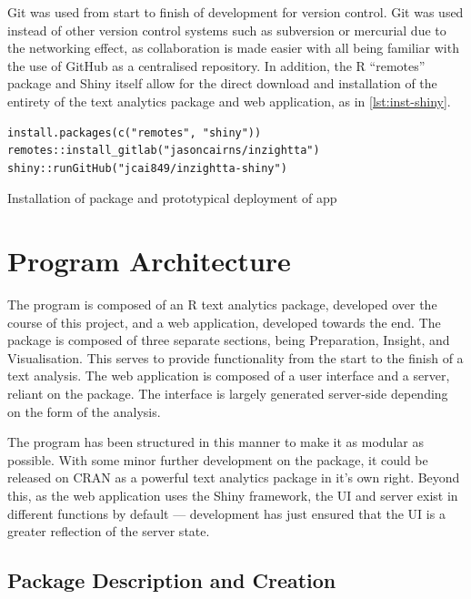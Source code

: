 \message{ !name(jason-cairns-dissertation.tex)}\documentclass[11pt, a4paper, titlepage]{report}
\begin{document}
Git was used from start to finish of development for version control.
Git was used instead of other version control systems such as
subversion or mercurial due to the networking effect, as collaboration
is made easier with all being familiar with the use of GitHub as a
centralised repository. In addition, the R ``remotes'' package and
Shiny itself allow for the direct download and installation of the
entirety of the text analytics package and web application, as in
\cref{lst:inst-shiny}.

\begin{listing}[ht]
\begin{verbatim}
install.packages(c("remotes", "shiny"))
remotes::install_gitlab("jasoncairns/inzightta")
shiny::runGitHub("jcai849/inzightta-shiny")
\end{verbatim}
\caption{Installation of package and prototypical deployment of app\label{lst:inst-shiny}}
\end{listing}

\section{Program Architecture}\label{sec:program-architecture-1}

The program is composed of an R text analytics package, developed over
the course of this project, and a web application, developed
towards the end. The package is composed of three separate sections,
being Preparation, Insight, and Visualisation. This serves to provide
functionality from the start to the finish of a text analysis. The web
application is composed of a user interface and a server, reliant on
the package. The interface is largely generated server-side depending
on the form of the analysis.

The program has been structured in this manner to make it as modular
as possible. With some minor further development on the package, it
could be released on CRAN as a powerful text analytics package in it's
own right. Beyond this, as the web application uses the Shiny
framework, the UI and server exist in different functions by default
--- development has just ensured that the UI is a greater reflection
of the server state.

\subsection{Package Description and Creation}
\end{document}
